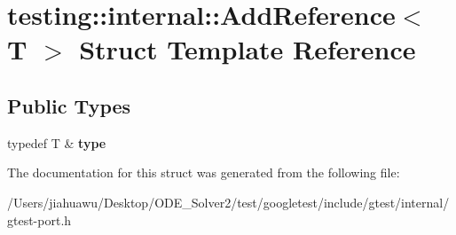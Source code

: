 \hypertarget{structtesting_1_1internal_1_1_add_reference}{}\section{testing\+:\+:internal\+:\+:Add\+Reference$<$ T $>$ Struct Template Reference}
\label{structtesting_1_1internal_1_1_add_reference}
\subsection*{Public Types}
\begin{DoxyCompactItemize}
\item 
\mbox{\label{structtesting_1_1internal_1_1_add_reference_a2df8dd7c4e41f6390e6e66b1a9a67bb4}} 
typedef T \& {\bfseries type}
\end{DoxyCompactItemize}


The documentation for this struct was generated from the following file\+:\begin{DoxyCompactItemize}
\item 
/\+Users/jiahuawu/\+Desktop/\+O\+D\+E\+\_\+\+Solver2/test/googletest/include/gtest/internal/gtest-\/port.\+h\end{DoxyCompactItemize}
